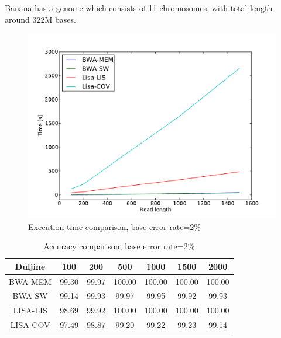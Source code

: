 \documentclass[times, utf8, diplomski]{fer}
\begin{document}
Banana has a genome which consists of 11 chromosomes, with total length around 322M bases.

\begin{figure}[H]
\centering
\includegraphics[width=1.0\textwidth]{../img/banana-e02-time.pdf}
\caption{Execution time comparison, base error rate=2\%}\label{banana-e02-time}
\end{figure}

\begin{table}[H]
\centering
\begin{tabular}{|c||c|c|c|c|c|c|}
\hline
	Duljine & 100 & 200 & 500 & 1000 & 1500 & 2000\\
\hline
\hline
	BWA-MEM & 99.30 & 99.97 & 100.00 & 100.00 & 100.00 & 100.00\\
\hline
	BWA-SW  & 99.14 & 99.93 & 99.97 & 99.95 & 99.92 & 99.93\\
\hline
	LISA-LIS   & 98.69 & 99.92 & 100.00 & 100.00 & 100.00 & 100.00\\
\hline
	LISA-COV & 97.49 & 98.87 & 99.20 & 99.22 & 99.23 & 99.14\\
\hline
\end{tabular}
\caption{Accuracy comparison, base error rate=2\%}\label{banana-e02-correct}
\end{table}
\end{document}
